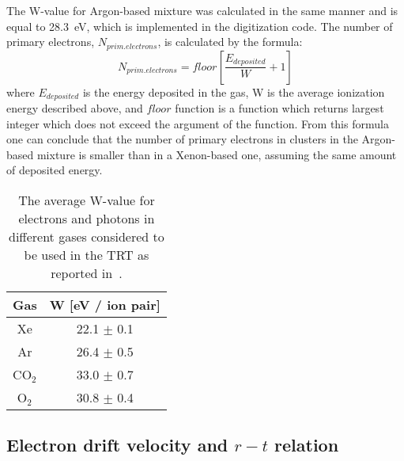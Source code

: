 The W-value for Argon-based mixture was calculated in the same manner and is equal to 28.3~eV, which is implemented in the digitization code.
The number of primary electrons, $N_{prim.electrons}$, is calculated by the formula:
\begin{equation}
 N_{prim.electrons} = floor \left[\dfrac{E_{deposited}}{W} + 1\right]
\end{equation}
where $E_{deposited}$ is the energy deposited in the gas, W is the average ionization energy described above, and $floor$ function is a function which returns
largest integer which does not exceed the argument of the function.
From this formula one can conclude that the number of primary electrons in clusters in the Argon-based mixture is smaller than in a Xenon-based one, 
assuming the same amount of deposited energy.

\begin{table}[p]
  \begin{tabular}{c|c}
    Gas & W [eV / ion pair]\\
    \hline
    Xe & 22.1 $\pm$ 0.1 \\
    Ar & 26.4 $\pm$ 0.5 \\
    CO$_2$ & 33.0 $\pm$ 0.7 \\
    O$_2$ & 30.8 $\pm$ 0.4 \\
  \end{tabular}
  \caption{The average W-value for electrons and photons in different gases considered to be used in the TRT as reported in~\cite{cwetanski_thesis}.}
  \label{tab:ionization_energy}
\end{table}

\subsection{Electron drift velocity and $r-t$ relation}

